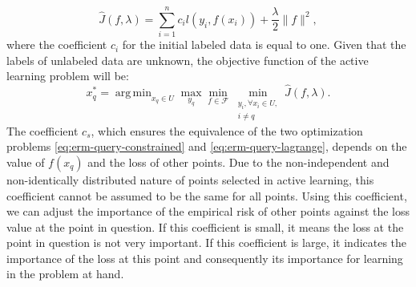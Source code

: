 \documentclass[12pt]{article}
\DeclareMathOperator*{\argmin}{arg\,min}
\begin{document}
	\begin{equation}
		\hat{J}(f, \lambda) = \sum_{i=1}^{n} c_i l(y_i, f(x_i)) + \frac{\lambda}{2}\|f\|^2,
	\end{equation}
	where the coefficient $c_i$ for the initial labeled data is equal to one. Given that the labels of unlabeled data are unknown, the objective function of the active learning problem will be:
	\begin{equation}
		\label{eq:erm-final}
		x^*_q = \argmin_{x_q \in U} \max_{y_q} \min_{f \in \mathcal{F}} \min_{\substack{y_i, \forall x_i \in U, \\ i \neq q}} \hat{J}(f, \lambda).
	\end{equation}
	The coefficient $c_s$, which ensures the equivalence of the two optimization problems \eqref{eq:erm-query-constrained} and \eqref{eq:erm-query-lagrange}, depends on the value of $f(x_q)$ and the loss of other points. Due to the non-independent and non-identically distributed nature of points selected in active learning, this coefficient cannot be assumed to be the same for all points. Using this coefficient, we can adjust the importance of the empirical risk of other points against the loss value at the point in question. If this coefficient is small, it means the loss at the point in question is not very important. If this coefficient is large, it indicates the importance of the loss at this point and consequently its importance for learning in the problem at hand.
	
\end{document}
